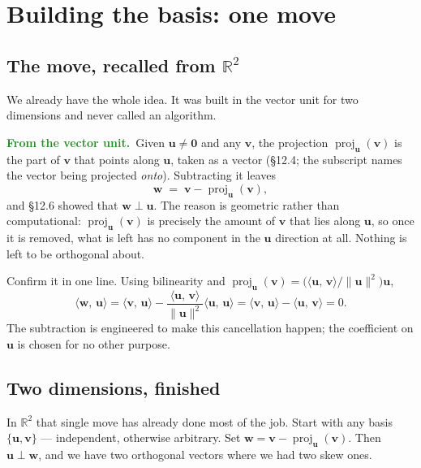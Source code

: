 \documentclass[11pt]{article}
\theoremstyle{plain}
\theoremstyle{definition}
\theoremstyle{remark}
\newcommand{\lookback}{\par\smallskip\noindent
  \textbf{\sffamily\textcolor{ForestGreen}{From the vector unit.}}\ \ignorespaces}
\newcommand{\R}{\mathbb{R}}
\newcommand{\vc}[1]{\mathbf{#1}}
\newcommand{\norm}[1]{\lVert #1\rVert}
\newcommand{\ip}[2]{\langle #1,\, #2\rangle}
\newcommand{\proj}[2]{\operatorname{proj}_{#1}(#2)}
\begin{document}
\section{Building the basis: one move}

\subsection{The move, recalled from \texorpdfstring{$\R^{2}$}{R2}}
We already have the whole idea. It was built in the vector unit for two
dimensions and never called an algorithm.

\lookback Given $\vc{u}\neq\vc{0}$ and any $\vc{v}$, the projection
$\proj{\vc{u}}{\vc{v}}$ is the part of $\vc{v}$ that points along $\vc{u}$,
taken as a vector (\S12.4; the subscript names the vector being projected
\emph{onto}). Subtracting it leaves
\begin{equation}\label{eq:orthpiece}
  \vc{w} \;=\; \vc{v} - \proj{\vc{u}}{\vc{v}} ,
\end{equation}
and \S12.6 showed that $\vc{w}\perp\vc{u}$. The reason is geometric rather than
computational: $\proj{\vc{u}}{\vc{v}}$ is precisely the amount of $\vc{v}$ that
lies along $\vc{u}$, so once it is removed, what is left has no component in the
$\vc{u}$ direction at all. Nothing is left to be orthogonal about.

Confirm it in one line. Using bilinearity and
$\proj{\vc{u}}{\vc{v}}=\bigl(\ip{\vc{u}}{\vc{v}}/\norm{\vc{u}}^{2}\bigr)\vc{u}$,
\[
  \ip{\vc{w}}{\vc{u}}
  = \ip{\vc{v}}{\vc{u}} - \frac{\ip{\vc{u}}{\vc{v}}}{\norm{\vc{u}}^{2}}
    \ip{\vc{u}}{\vc{u}}
  = \ip{\vc{v}}{\vc{u}} - \ip{\vc{u}}{\vc{v}}
  = 0 .
\]
The subtraction is engineered to make this cancellation happen; the coefficient
on $\vc{u}$ is chosen for no other purpose.

\subsection{Two dimensions, finished}
In $\R^{2}$ that single move has already done most of the job. Start with any
basis $\{\vc{u},\vc{v}\}$ --- independent, otherwise arbitrary. Set
$\vc{w}=\vc{v}-\proj{\vc{u}}{\vc{v}}$. Then $\vc{u}\perp\vc{w}$, and we have
two orthogonal vectors where we had two skew ones.
\end{document}
